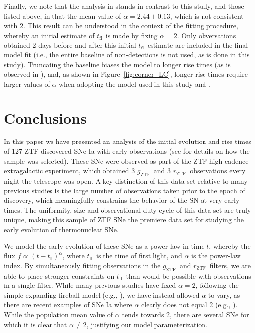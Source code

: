 \documentclass[twocolumn]{./aastex63}
\newcommand{\rztf}{$r_\mathrm{ZTF}$}
\newcommand{\gztf}{$g_\mathrm{ZTF}$}
\newcommand{\tfl}{$t_\mathrm{fl}$}
\begin{document}
Finally, we note that the analysis in \citet{Firth15} stands in contrast to this
study, and those listed above, in that the mean value of $\alpha = 2.44 \pm
0.13$, which is not consistent with 2. This result can be understood in the
context of the \citet{Firth15} fitting procedure, whereby an initial estimate of
\tfl\ is made by fixing $\alpha = 2$. Only obversations obtained 2 days before
and after this initial \tfl\ estimate are included in the final model fit (i.e.,
the entire baseline of non-detections is not used, as is done in this study).
Truncating the baseline biases the model to longer rise times (as is observed in
\citealt{Firth15}), and, as shown in Figure~\ref{fig:corner_LC}, longer rise
times require larger values of $\alpha$ when adopting the model used in this
study and \citep{Firth15}.

\section{Conclusions}

In this paper we have presented an analysis of the initial evolution and rise
times of 127 ZTF-discovered SNe Ia with early observations (see \citealt{Yao19}
for details on how the sample was selected). These SNe were observed as part of
the ZTF high-cadence extragalactic experiment, which obtained 3 \gztf\ and 3
\rztf\ observations every night the telescope was open. A key distinction of
this data set relative to many previous studies is the large number of
observations taken prior to the epoch of discovery, which meaningfully
constrains the behavior of the SN at very early times. The uniformity, size and
observational duty cycle of this data set are truly unique, making this sample
of ZTF SNe the premiere data set for studying the early evolution of
thermonuclear SNe.

We model the early evolution of these SNe as a power-law in time $t$, whereby
the flux $f \propto (t - t_\mathrm{fl})^\alpha$, where \tfl\ is the time of
first light, and $\alpha$ is the power-law index. By simultaneously fitting
observations in the \gztf\ and \rztf\ filters, we are able to place stronger
constraints on \tfl\ than would be possible with observations in a single
filter. While many previous studies have fixed $\alpha = 2$, following the
simple expanding fireball model (e.g., \citealt{Riess99a}), we have instead
allowed $\alpha$ to vary, as there are recent examples of SNe Ia where $\alpha$
clearly does not equal 2 (e.g., \citealt{Zheng13, Miller18,Shappee16}). While
the population mean value of $\alpha$ tends towards 2, there are several SNe for
which it is clear that $\alpha \ne 2$, justifying our model parameterization.
\end{document}

